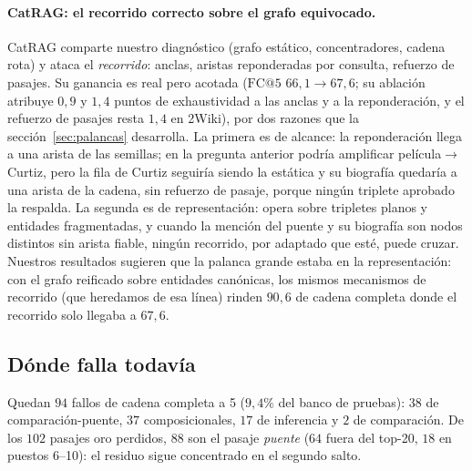 \documentclass[11pt,a4paper]{article}
\begin{document}
\paragraph{CatRAG: el recorrido correcto sobre el grafo equivocado.}
CatRAG comparte nuestro diagnóstico (grafo estático, concentradores,
cadena rota) y ataca el \emph{recorrido}: anclas, aristas reponderadas por
consulta, refuerzo de pasajes. Su ganancia es real pero acotada
($\mathrm{FC@}5$ $66{,}1 \to 67{,}6$; su ablación atribuye $0{,}9$ y
$1{,}4$ puntos de exhaustividad a las anclas y a la reponderación, y el
refuerzo de pasajes resta $1{,}4$ en 2Wiki), por dos razones que la
sección~\ref{sec:palancas} desarrolla. La primera es de alcance: la
reponderación llega a una arista de las semillas; en la pregunta anterior
podría amplificar película$\to$Curtiz, pero la fila de Curtiz seguiría
siendo la estática y su biografía quedaría a una arista de la cadena,
sin refuerzo de pasaje, porque ningún triplete aprobado la respalda. La
segunda es de representación: opera sobre tripletes planos y entidades
fragmentadas, y cuando la mención del puente y su biografía son nodos
distintos sin arista fiable, ningún recorrido, por adaptado que esté,
puede cruzar. Nuestros resultados sugieren que la
palanca grande estaba en la representación: con el grafo reificado sobre
entidades canónicas, los mismos mecanismos de recorrido (que heredamos de
esa línea) rinden $90{,}6$ de cadena completa donde el recorrido solo
llegaba a $67{,}6$.

\subsection{Dónde falla todavía}
\label{sec:falla-aun}

Quedan $94$ fallos de cadena completa a 5 ($9{,}4\%$ del banco de
pruebas): $38$ de comparación-puente, $37$ composicionales, $17$ de
inferencia y $2$ de comparación. De los $102$ pasajes oro perdidos, $88$
son el pasaje \emph{puente} ($64$ fuera del top-20, $18$ en puestos
6--10): el residuo sigue concentrado en el segundo salto.
\end{document}
